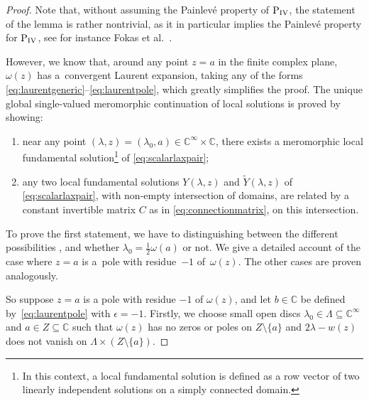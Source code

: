 \documentclass[pdftex]{sigma}
\numberwithin{equation}{section}
\newcommand{\om}{\omega}
\begin{document}
\begin{proof}
Note that, without assuming the Painlev\'e property of ${\rm P}_{\rm IV}$, the statement of the lemma is rather nontrivial, as it in particular implies the Painlev\'e property for ${\rm P}_{\rm IV}$, see for instance Fokas et al.~\cite{fokas}.

However, we know that, around any point $z=a$ in the f\/inite complex plane, $\om(z)$ has a~convergent Laurent expansion, taking any of the forms \eqref{eq:laurentgeneric}--\eqref{eq:laurentpole}, which greatly simplif\/ies the proof. The unique global single-valued meromorphic continuation of local solutions is proved by showing:
\begin{enumerate}\itemsep=0pt
	\item[1)] near any point $(\lambda,z)=(\lambda_0,a)\in \mathbb{C}^\infty\times \mathbb{C}$, there exists a meromorphic local fundamental solution\footnote{In this context, a local fundamental solution is def\/ined as a row vector of two linearly independent solutions on a simply connected domain.} of \eqref{eq:scalarlaxpair};
	\item[2)] any two local fundamental solutions $Y(\lambda,z)$ and $\widetilde{Y}(\lambda,z)$ of \eqref{eq:scalarlaxpair}, with non-empty intersection of domains, are related by a constant invertible matrix $C$ as in \eqref{eq:connectionmatrix}, on this intersection. %
\end{enumerate}
To prove the f\/irst statement, we have to distinguishing between the dif\/ferent possibilities \smash{\eqref{eq:laurentgeneric}--\eqref{eq:laurentpole}}, and whether $\lambda_0=\tfrac{1}{2}\om(a)$ or not. We give a detailed account of the case where $z=a$ is a~pole with residue~$-1$ of~$\om(z)$. The other cases are proven analogously.

So suppose $z=a$ is a pole with residue $-1$ of $\om(z)$, and let $b\in\mathbb{C}$ be def\/ined by~\eqref{eq:laurentpole} with $\epsilon=-1$.
Firstly, we choose small open discs $\lambda_0\in \Lambda\subseteq \mathbb{C}^\infty$ and $a\in Z\subseteq\mathbb{C}$ such that $\om(z)$ has no zeros or poles on $Z\setminus\{a\}$ and $2\lambda-w(z)$ does not vanish on $\Lambda\times (Z\setminus\{a\})$.


\end{proof}
\end{document}

